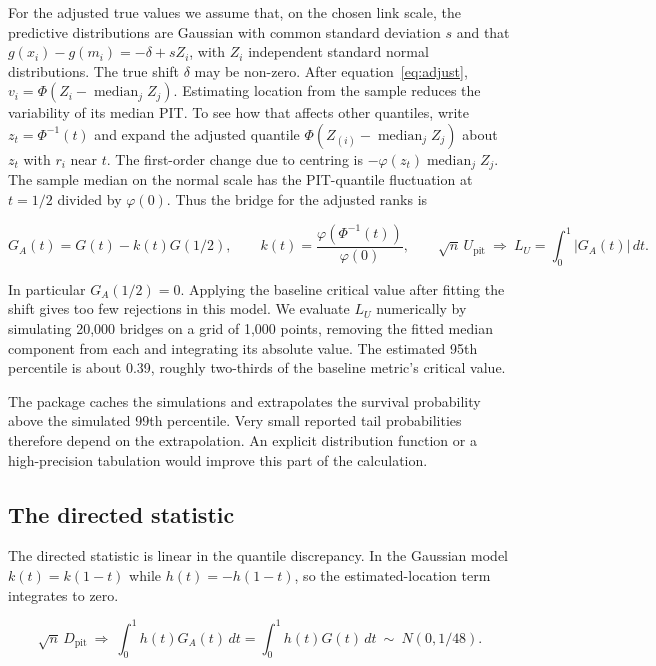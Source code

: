\documentclass[twoside,11pt,hyphens]{article}
\newcommand{\Dpit}{D_{\mathrm{pit}}}
\newcommand{\Upit}{U_{\mathrm{pit}}}
\DeclareMathOperator{\med}{median}
\begin{document}

For the adjusted true values we assume that, on the chosen link scale, the predictive distributions are Gaussian with common standard deviation $s$ and that $g(x_i)-g(m_i)=-\delta+sZ_i$, with $Z_i$ independent standard normal distributions. The true shift $\delta$ may be non-zero. After equation~\eqref{eq:adjust}, $v_i=\Phi(Z_i-\med_j Z_j)$. Estimating location from the sample reduces the variability of its median PIT. To see how that affects other quantiles, write $z_t=\Phi^{-1}(t)$ and expand the adjusted quantile $\Phi(Z_{(i)}-\med_j Z_j)$ about $z_t$ with $r_i$ near $t$. The first-order change due to centring is $-\varphi(z_t)\med_j Z_j$. The sample median on the normal scale has the PIT-quantile fluctuation at $t=1/2$ divided by $\varphi(0)$. Thus the bridge for the adjusted ranks is

\begin{equation}
 G_A(t)=G(t)-k(t)G(1/2),\qquad
 k(t)=\frac{\varphi(\Phi^{-1}(t))}{\varphi(0)},\qquad
 \sqrt n\,\Upit\ \Longrightarrow\ L_U=\int_0^1 |G_A(t)|\,dt .
 \label{eq:adjusted-limit}
\end{equation}

In particular $G_A(1/2)=0$. Applying the baseline critical value after fitting the shift gives too few rejections in this model. We evaluate $L_U$ numerically by simulating 20,000 bridges on a grid of 1,000 points, removing the fitted median component from each and integrating its absolute value. The estimated 95th percentile is about 0.39, roughly two-thirds of the baseline metric's critical value.

The package caches the simulations and extrapolates the survival probability above the simulated 99th percentile. Very small reported tail probabilities therefore depend on the extrapolation. An explicit distribution function or a high-precision tabulation would improve this part of the calculation.

\subsection{The directed statistic}

The directed statistic is linear in the quantile discrepancy. In the Gaussian model $k(t)=k(1-t)$ while $h(t)=-h(1-t)$, so the estimated-location term integrates to zero.

\begin{equation}
 \sqrt n\,\Dpit\ \Longrightarrow\ \int_0^1 h(t)G_A(t)\,dt
 =\int_0^1 h(t)G(t)\,dt\ \sim\ N(0,1/48).
 \label{eq:directed-limit}
\end{equation}
\end{document}
